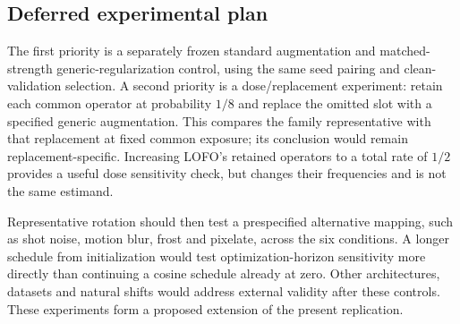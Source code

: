 \documentclass[twoside,a4paper,11pt]{article}
\begin{document}
\subsection{Deferred experimental plan}
\label{supp:future}
The first priority is a separately frozen standard augmentation and matched-strength generic-regularization control, using the same seed pairing and clean-validation selection. A second priority is a dose/replacement experiment: retain each common operator at probability $1/8$ and replace the omitted slot with a specified generic augmentation. This compares the family representative with that replacement at fixed common exposure; its conclusion would remain replacement-specific. Increasing LOFO's retained operators to a total rate of $1/2$ provides a useful dose sensitivity check, but changes their frequencies and is not the same estimand.

Representative rotation should then test a prespecified alternative mapping, such as shot noise, motion blur, frost and pixelate, across the six conditions. A longer schedule from initialization would test optimization-horizon sensitivity more directly than continuing a cosine schedule already at zero. Other architectures, datasets and natural shifts would address external validity after these controls. These experiments form a proposed extension of the present replication.


\FloatBarrier
\clearpage


\end{document}
